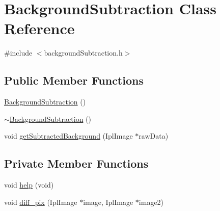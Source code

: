 \hypertarget{classBackgroundSubtraction}{
\section{BackgroundSubtraction Class Reference}
\label{classBackgroundSubtraction}
}


{\ttfamily \#include $<$backgroundSubtraction.h$>$}

\subsection*{Public Member Functions}
\begin{DoxyCompactItemize}
\item 
\hyperlink{classBackgroundSubtraction_ade7209bf0172def580503067920b50a8}{BackgroundSubtraction} ()
\item 
\hyperlink{classBackgroundSubtraction_acd4273d5bf204d5cc4bece4082478a68}{$\sim$BackgroundSubtraction} ()
\item 
void \hyperlink{classBackgroundSubtraction_a80b51bfd616204f7a47015913c550dac}{getSubtractedBackground} (IplImage $\ast$rawData)
\end{DoxyCompactItemize}
\subsection*{Private Member Functions}
\begin{DoxyCompactItemize}
\item 
void \hyperlink{classBackgroundSubtraction_a81c9be9b26ae88ec2458d6980cb755e7}{help} (void)
\item 
void \hyperlink{classBackgroundSubtraction_a0eaa0727297fbca2ae688ea1fe6077e0}{diff\_\-pix} (IplImage $\ast$image, IplImage $\ast$image2)
\end{DoxyCompactItemize}
